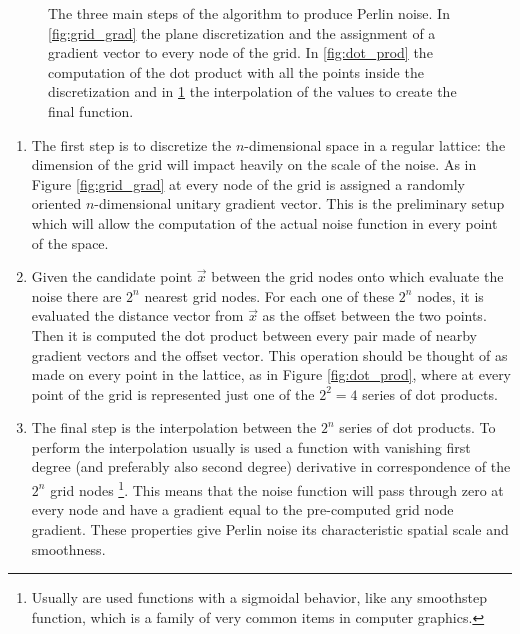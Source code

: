 \begin{figure}
\begin{subfigure}[b]{0.3\textwidth}
             \caption{}
             \label{fig:interp}
        \end{subfigure}
        \caption{The three main steps of the algorithm to produce Perlin noise. In \ref{fig:grid_grad} the plane discretization and the assignment of a gradient vector to every node of the grid. In \ref{fig:dot_prod} the computation of the dot product with all the points inside the discretization and in \ref{fig:interp} the interpolation of the values to create the final function.}
        \label{fig:perlin_alg}
    \end{figure}

    \begin{enumerate}
        \item The first step is to discretize the $n$-dimensional space in a regular lattice: the dimension of the grid will impact heavily on the scale of the noise. As in Figure \ref{fig:grid_grad} at every node of the grid is assigned a randomly oriented $n$-dimensional unitary gradient vector. This is the preliminary setup which will allow the computation of the actual noise function in every point of the space.

        \item Given the candidate point $\vec x$ between the grid nodes onto which evaluate the noise there are $2^n$ nearest grid nodes. For each one of these $2^n$ nodes, it is evaluated the distance vector from $\vec x$ as the offset between the two points. Then it is computed the dot product between every pair made of nearby gradient vectors and the offset vector. This operation should be thought of as made on every point in the lattice, as in Figure \ref{fig:dot_prod}, where at every point of the grid is represented just one of the $2^2 = 4$ series of dot products.

        \item The final step is the interpolation between the $2^n$ series of dot products. To perform the interpolation usually is used a function with vanishing first degree (and preferably also second degree) derivative in correspondence of the $2^n$ grid nodes \footnote{Usually are used functions with a sigmoidal behavior, like any smoothstep function, which is a family of very common items in computer graphics.}. This means that the noise function will pass through zero at every node and have a gradient equal to the pre-computed grid node gradient. These properties give Perlin noise its characteristic spatial scale and smoothness.
    \end{enumerate}

